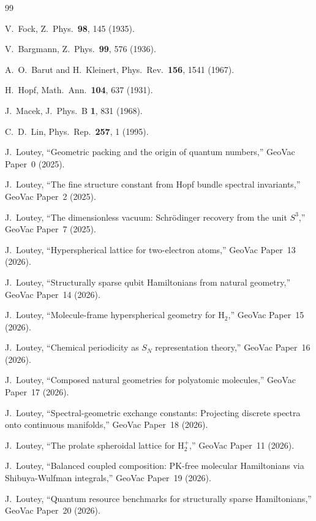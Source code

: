 \documentclass[aps,pra,twocolumn,superscriptaddress,longbibliography]{revtex4-2}
\begin{document}
\begin{thebibliography}{99}

V.~Fock, Z.\ Phys.\ \textbf{98}, 145 (1935).

V.~Bargmann, Z.\ Phys.\ \textbf{99}, 576 (1936).

A.~O.~Barut and H.~Kleinert, Phys.\ Rev.\ \textbf{156}, 1541 (1967).

H.~Hopf, Math.\ Ann.\ \textbf{104}, 637 (1931).

J.~Macek, J.\ Phys.\ B \textbf{1}, 831 (1968).

C.~D.~Lin, Phys.\ Rep.\ \textbf{257}, 1 (1995).

J.~Loutey, ``Geometric packing and the origin of quantum numbers,''
GeoVac Paper~0 (2025).

J.~Loutey, ``The fine structure constant from Hopf bundle spectral
invariants,'' GeoVac Paper~2 (2025).

J.~Loutey, ``The dimensionless vacuum: Schr\"odinger recovery from the
unit $S^3$,'' GeoVac Paper~7 (2025).

J.~Loutey, ``Hyperspherical lattice for two-electron atoms,'' GeoVac
Paper~13 (2026).

J.~Loutey, ``Structurally sparse qubit Hamiltonians from natural
geometry,'' GeoVac Paper~14 (2026).

J.~Loutey, ``Molecule-frame hyperspherical geometry for $\text{H}_2$,''
GeoVac Paper~15 (2026).

J.~Loutey, ``Chemical periodicity as $S_N$ representation theory,''
GeoVac Paper~16 (2026).

J.~Loutey, ``Composed natural geometries for polyatomic molecules,''
GeoVac Paper~17 (2026).

J.~Loutey, ``Spectral-geometric exchange constants: Projecting discrete
spectra onto continuous manifolds,'' GeoVac Paper~18 (2026).

J.~Loutey, ``The prolate spheroidal lattice for H$_2^+$,'' GeoVac
Paper~11 (2026).

J.~Loutey, ``Balanced coupled composition: PK-free molecular
Hamiltonians via Shibuya-Wulfman integrals,'' GeoVac Paper~19 (2026).

J.~Loutey, ``Quantum resource benchmarks for structurally sparse
Hamiltonians,'' GeoVac Paper~20 (2026).

\end{thebibliography}
\end{document}
